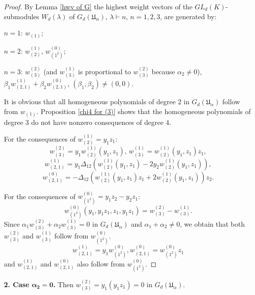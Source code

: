 \documentclass{amsart}
\theoremstyle{definition}
\begin{document}
\begin{proof}
By Lemma \ref{hwv of G} the highest weight vectors of the $GL_d(K)$-submodules $W_d(\lambda)$ of $G_d({\mathfrak U}_{\alpha})$, $\lambda\vdash n$, $n=1,2,3$, are generated by:

$n=1$: $w_{(1)}$;

$n=2$: $w_{(2)}^{(1)}$, $w_{(1^2)}^{(0)}$;

$n=3$: $w_{(3)}^{(2)}$ (and $w_{(3)}^{(1)}$ is proportional to $w_{(3)}^{(2)}$ because $\alpha_2\not=0$), $\beta_1w_{(2,1)}^{(1)}+\beta_2w_{(2,1)}^{(0)}$, $(\beta_1,\beta_2)\not=(0,0)$.

It is obvious that all homogeneous polynomials of degree 2 in $G_d({\mathfrak U}_{\alpha})$ follow from $w_{(1)}$.
Proposition \ref{chi4 for (3)} shows that the homogeneous polynomials of degree 3 do not have nonzero consequences of degree 4.

For the consequences of $w_{(2)}^{(1)}=y_1z_1$:
\[
w_{(3)}^{(2)}=y_1w_{(2)}^{(1)}(y_1,z_1),\, w_{(3)}^{(1)}=w_{(2)}^{(1)}(y_1,z_1)z_1,
\]
\[
w_{(2,1)}^{(1)}=y_1\Delta_{12}(w_{(2)}^{(1)}(y_1,z_1)-2y_2w_{(2)}^{(1)}(y_1,z_1)),
\]
\[
w_{(2,1)}^{(0)}=-\Delta_{12}(w_{(2)}^{(1)}(y_1,z_1)z_1+2w_{(2)}^{(1)}(y_1,z_1))z_2.
\]

For the consequences of $w_{(1^2)}^{(0)}=y_1z_2-y_2z_1$:
\[
w_{(1^2)}^{(0)}(y_1,y_1z_1,z_1,y_1z_1)=w_{(3)}^{(2)}-w_{(3)}^{(1)}.
\]
Since $\alpha_1w_{(3)}^{(2)}+\alpha_2w_{(3)}^{(1)}=0$ in $G_d({\mathfrak U}_{\alpha})$ and $\alpha_1+\alpha_2\not=0$, we obtain that both
$w_{(3)}^{(2)}$ and $w_{(3)}^{(1)}$ follow from $w_{(1^2)}^{(0)}$.
\[
w_{(2,1)}^{(1)}=y_1w_{(1^2)}^{(0)}, w_{(2,1)}^{(0)}=w_{(1^2)}^{(0)}z_1
\]
and $w_{(2,1)}^{(1)}$ and $w_{(2,1)}^{(0)}$ also follow from $w_{(1^2)}^{(0)}$.
\end{proof}

{\bf 2. Case $\bm{\alpha_2=0}$.} Then $w_{(3)}^{(2)}=y_1(y_1z_1)=0$ in $G_d({\mathfrak U}_{\alpha})$.
\end{document}
